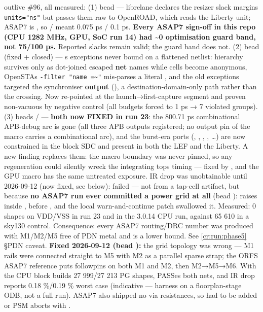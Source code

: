 \begin{record}
\begin{enumerate}
{  outlive \#96, all measured:} (1) bead  --- librelane
  declares the resizer slack margins \texttt{units=\allowbreak{}"ns"}
  but passes them raw to OpenROAD, which reads the Liberty unit; ASAP7
  is , so / meant 0.075 ps / 0.1 ps.
  \textbf{Every ASAP7 sign-off in this repo (CPU 1282 MHz, GPU, SoC run
  14) had \textasciitilde0 optimisation guard band, not 75/100 ps.}
  Reported slacks remain valid; the guard band does not. (2) bead
   (fixed + closed) ---
  \textquotesingle s exceptions never bound
  on a flattened netlist: hierarchy survives only as dot-joined escaped
  \textbf{net} names while cells become anonymous,
  OpenSTA\textquotesingle s
  \texttt{-\allowbreak{}filter\ "name\ =\allowbreak{}\textasciitilde{}"}
  mis-parses a literal , and the old exceptions targeted the
  synchroniser \textbf{output} (), a destination-domain-only
  path rather than the crossing. Now re-pointed at the
  launch→first-capture segment and proven non-vacuous by negative
  control (all budgets forced to 1 ps → 7 violated groups). (3) beads
  / --- \textbf{both now FIXED in run 23}: the
  800.71 ps combinational APB-debug arc is gone (all three APB outputs
  registered; no output pin of the macro carries a combinational arc),
  and the burst-era ports (, ,
  , , \ldots) are now constrained in the block
  SDC and present in both the LEF and the Liberty. A new finding
  replaces them: the macro boundary was never pinned, so any
  regeneration could silently wreck the integrating
  top\textquotesingle s timing --- fixed by , and
  the GPU macro has the same untreated exposure. IR drop was
  unobtainable until 2026-09-12 (now fixed, see below):
   failed  --- \warn{} not from
  a tap-cell artifact, but because \textbf{no ASAP7 run ever committed a
  power grid at all} (bead ):  raises
   inside , before ,
  and the local warn-and-continue patch swallowed it. Measured: 0
   shapes on VDD/VSS in run 23 and in the 3.0.14 CPU run,
  against 65 610 in a sky130 control. Consequence: every ASAP7
  routing/\allowbreak{}DRC number was produced with M1/M2/M5 free of PDN
  metal and is a lower bound. See \cref{cr:run:phase5} §PDN
  caveat. \textbf{Fixed 2026-09-12 (bead ):} the grid topology
  was wrong --- M1 rails were connected straight to M5 with M2 as a
  parallel sparse strap; the ORFS ASAP7 reference puts followpins on
  both M1 and M2, then M2→M5→M6. With 
  the CPU block builds 27 999/27 213 PG shapes, 
  PASSes both nets, and IR drop reports 0.18 \%/0.19 \% worst case
  (indicative --- harness on a floorplan-stage ODB, not a full run).
  ASAP7 also shipped no via resistances, so  had to be
  added or PSM aborts with .
\end{enumerate}


\end{record}
